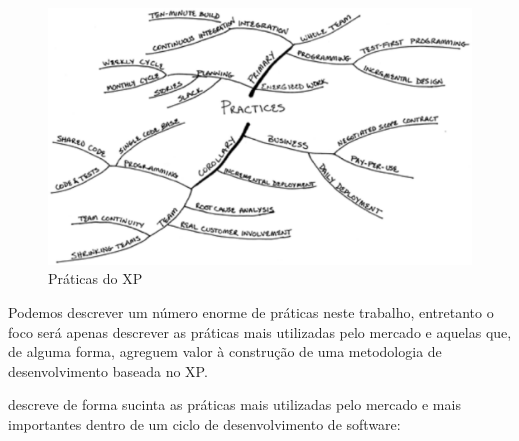 \begin{figure}[ht]
	\centering
		\includegraphics[keepaspectratio=true,scale=0.5]{figuras/fig02.eps}
	\caption{Práticas do XP \cite{Beck:2004}}
	\label{fig02}
\end{figure}

Podemos descrever um número enorme de práticas neste trabalho, entretanto o foco será apenas descrever as práticas mais utilizadas pelo mercado e aquelas que, de alguma forma, agreguem valor à construção de uma metodologia de desenvolvimento baseada no XP.

\cite{Maurer:2002} descreve de forma sucinta as práticas mais utilizadas pelo mercado e mais importantes dentro de um ciclo de desenvolvimento de software:


